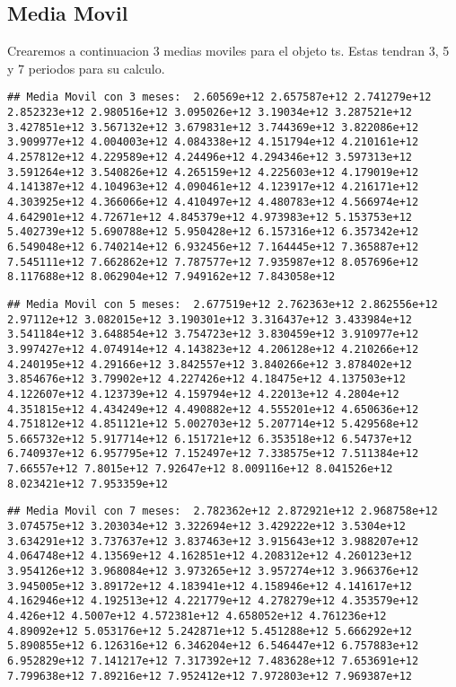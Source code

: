 \documentclass[
]{book}
\begin{document}
\hypertarget{media-movil}{%
\subsection{Media Movil}\label{media-movil}}

Crearemos a continuacion 3 medias moviles para el objeto ts. Estas tendran 3, 5 y 7 periodos para su calculo.

\begin{verbatim}
## Media Movil con 3 meses:  2.60569e+12 2.657587e+12 2.741279e+12 2.852323e+12 2.980516e+12 3.095026e+12 3.19034e+12 3.287521e+12 3.427851e+12 3.567132e+12 3.679831e+12 3.744369e+12 3.822086e+12 3.909977e+12 4.004003e+12 4.084338e+12 4.151794e+12 4.210161e+12 4.257812e+12 4.229589e+12 4.24496e+12 4.294346e+12 3.597313e+12 3.591264e+12 3.540826e+12 4.265159e+12 4.225603e+12 4.179019e+12 4.141387e+12 4.104963e+12 4.090461e+12 4.123917e+12 4.216171e+12 4.303925e+12 4.366066e+12 4.410497e+12 4.480783e+12 4.566974e+12 4.642901e+12 4.72671e+12 4.845379e+12 4.973983e+12 5.153753e+12 5.402739e+12 5.690788e+12 5.950428e+12 6.157316e+12 6.357342e+12 6.549048e+12 6.740214e+12 6.932456e+12 7.164445e+12 7.365887e+12 7.545111e+12 7.662862e+12 7.787577e+12 7.935987e+12 8.057696e+12 8.117688e+12 8.062904e+12 7.949162e+12 7.843058e+12
\end{verbatim}

\begin{verbatim}
## Media Movil con 5 meses:  2.677519e+12 2.762363e+12 2.862556e+12 2.97112e+12 3.082015e+12 3.190301e+12 3.316437e+12 3.433984e+12 3.541184e+12 3.648854e+12 3.754723e+12 3.830459e+12 3.910977e+12 3.997427e+12 4.074914e+12 4.143823e+12 4.206128e+12 4.210266e+12 4.240195e+12 4.29166e+12 3.842557e+12 3.840266e+12 3.878402e+12 3.854676e+12 3.79902e+12 4.227426e+12 4.18475e+12 4.137503e+12 4.122607e+12 4.123739e+12 4.159794e+12 4.22013e+12 4.2804e+12 4.351815e+12 4.434249e+12 4.490882e+12 4.555201e+12 4.650636e+12 4.751812e+12 4.851121e+12 5.002703e+12 5.207714e+12 5.429568e+12 5.665732e+12 5.917714e+12 6.151721e+12 6.353518e+12 6.54737e+12 6.740937e+12 6.957795e+12 7.152497e+12 7.338575e+12 7.511384e+12 7.66557e+12 7.8015e+12 7.92647e+12 8.009116e+12 8.041526e+12 8.023421e+12 7.953359e+12
\end{verbatim}

\begin{verbatim}
## Media Movil con 7 meses:  2.782362e+12 2.872921e+12 2.968758e+12 3.074575e+12 3.203034e+12 3.322694e+12 3.429222e+12 3.5304e+12 3.634291e+12 3.737637e+12 3.837463e+12 3.915643e+12 3.988207e+12 4.064748e+12 4.13569e+12 4.162851e+12 4.208312e+12 4.260123e+12 3.954126e+12 3.968084e+12 3.973265e+12 3.957274e+12 3.966376e+12 3.945005e+12 3.89172e+12 4.183941e+12 4.158946e+12 4.141617e+12 4.162946e+12 4.192513e+12 4.221779e+12 4.278279e+12 4.353579e+12 4.426e+12 4.5007e+12 4.572381e+12 4.658052e+12 4.761236e+12 4.89092e+12 5.053176e+12 5.242871e+12 5.451288e+12 5.666292e+12 5.890855e+12 6.126316e+12 6.346204e+12 6.546447e+12 6.757883e+12 6.952829e+12 7.141217e+12 7.317392e+12 7.483628e+12 7.653691e+12 7.799638e+12 7.89216e+12 7.952412e+12 7.972803e+12 7.969387e+12
\end{verbatim}
\end{document}

